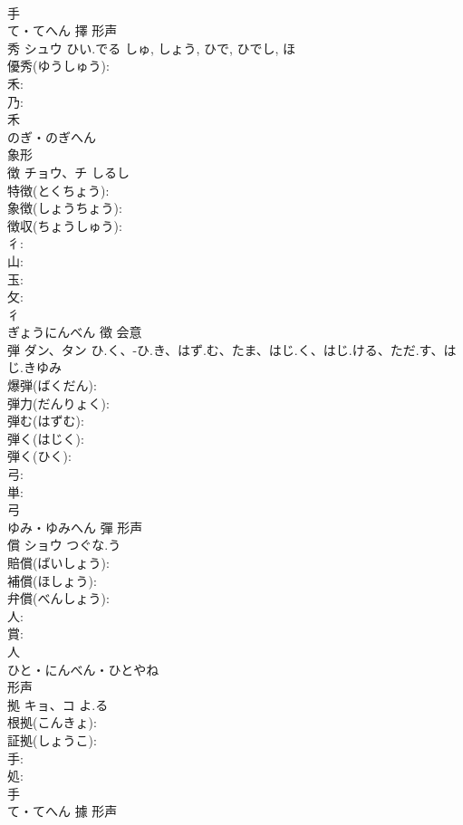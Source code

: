 \documentclass[8pt]{extreport}
\begin{document}
\begin{CJK}{UTF8}{min}
\\	手	
\\	て・てへん	擇	形声 
\\	秀	シュウ	ひい.でる	しゅ, しょう, ひで, ひでし, ほ	
\\	優秀(ゆうしゅう): 
\\	禾: 
\\	乃: 
\\	禾	
\\	のぎ・のぎへん	
\\	象形 
\\	徴	チョウ、チ	しるし		
\\	特徴(とくちょう): 
\\	象徴(しょうちょう): 
\\	徴収(ちょうしゅう): 
\\	彳: 
\\	山: 
\\	玉: 
\\	攵: 
\\	彳	
\\	ぎょうにんべん	徵	会意 
\\	弾	ダン、タン	ひ.く、-ひ.き、はず.む、たま、はじ.く、はじ.ける、ただ.す、はじ.きゆみ		
\\	爆弾(ばくだん): 
\\	弾力(だんりょく): 
\\	弾む(はずむ): 
\\	弾く(はじく): 
\\	弾く(ひく): 
\\	弓: 
\\	単: 
\\	弓	
\\	ゆみ・ゆみへん	彈	形声 
\\	償	ショウ	つぐな.う		
\\	賠償(ばいしょう): 
\\	補償(ほしょう): 
\\	弁償(べんしょう): 
\\	人: 
\\	賞: 
\\	人	
\\	ひと・にんべん・ひとやね	
\\	形声 
\\	拠	キョ、コ	よ.る		
\\	根拠(こんきょ): 
\\	証拠(しょうこ): 
\\	手: 
\\	処: 
\\	手	
\\	て・てへん	據	形声 

\end{CJK}
\end{document}
